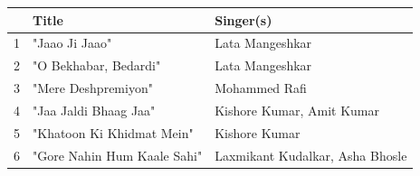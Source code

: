 \documentclass{article}
\begin{document}
\begin{tabular}{lll}
\toprule
 & Title & Singer(s) \\
\midrule
1 & "Jaao Ji Jaao" & Lata Mangeshkar \\
2 & "O Bekhabar, Bedardi" & Lata Mangeshkar \\
3 & "Mere Deshpremiyon" & Mohammed Rafi \\
4 & "Jaa Jaldi Bhaag Jaa" & Kishore Kumar, Amit Kumar \\
5 & "Khatoon Ki Khidmat Mein" & Kishore Kumar \\
6 & "Gore Nahin Hum Kaale Sahi" & Laxmikant Kudalkar, Asha Bhosle \\
\bottomrule
\end{tabular}
\end{document}
